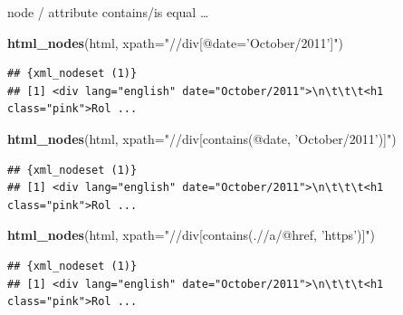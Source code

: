 \documentclass[ignorenonframetext,]{beamer}
\newenvironment{Shaded}{\begin{snugshade}}{\end{snugshade}}
\newcommand{\KeywordTok}[1]{\textcolor[rgb]{0.13,0.29,0.53}{\textbf{{#1}}}}
\newcommand{\DataTypeTok}[1]{\textcolor[rgb]{0.13,0.29,0.53}{{#1}}}
\newcommand{\StringTok}[1]{\textcolor[rgb]{0.31,0.60,0.02}{{#1}}}
\newcommand{\NormalTok}[1]{{#1}}
\begin{document}
\begin{frame}[fragile]{node / attribute contains/is equal \ldots{}}

\begin{Shaded}
\begin{Highlighting}[]
\KeywordTok{html_nodes}\NormalTok{(html, }\DataTypeTok{xpath=}\StringTok{"//div[@date='October/2011']"}\NormalTok{)}
\end{Highlighting}
\end{Shaded}

\begin{verbatim}
## {xml_nodeset (1)}
## [1] <div lang="english" date="October/2011">\n\t\t\t<h1 class="pink">Rol ...
\end{verbatim}

\begin{Shaded}
\begin{Highlighting}[]
\KeywordTok{html_nodes}\NormalTok{(html, }\DataTypeTok{xpath=}\StringTok{"//div[contains(@date, 'October/2011')]"}\NormalTok{)}
\end{Highlighting}
\end{Shaded}

\begin{verbatim}
## {xml_nodeset (1)}
## [1] <div lang="english" date="October/2011">\n\t\t\t<h1 class="pink">Rol ...
\end{verbatim}

\begin{Shaded}
\begin{Highlighting}[]
\KeywordTok{html_nodes}\NormalTok{(html, }\DataTypeTok{xpath=}\StringTok{"//div[contains(.//a/@href, 'https')]"}\NormalTok{)}
\end{Highlighting}
\end{Shaded}

\begin{verbatim}
## {xml_nodeset (1)}
## [1] <div lang="english" date="October/2011">\n\t\t\t<h1 class="pink">Rol ...
\end{verbatim}

\end{frame}
\end{document}
